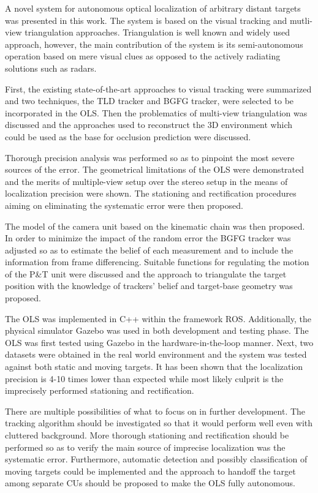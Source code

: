 A novel system for autonomous optical localization of arbitrary distant targets was presented in this work. The system is based on the visual tracking and mutli-view triangulation approaches. Triangulation is well known and widely used approach, however, the main contribution of the system is its semi-autonomous operation based on mere visual clues as opposed to the actively radiating solutions such as radars.

First, the existing state-of-the-art approaches to visual tracking were summarized and two techniques, the TLD tracker and BGFG tracker, were selected to be incorporated in the OLS. Then the problematics of multi-view triangulation was discussed and the approaches used to reconstruct the 3D environment which could be used as the base for occlusion prediction were discussed.

Thorough precision analysis was performed so as to pinpoint the most severe sources of the error. The geometrical limitations of the OLS were demonstrated and the merits of multiple-view setup over the stereo setup in the means of localization precision were shown. The stationing and rectification procedures aiming on eliminating the systematic error were then proposed. 

The model of the camera unit based on the kinematic chain was then proposed. In order to minimize the impact of the random error the BGFG tracker was adjusted so as to estimate the belief of each measurement and to include the information from frame differencing. Suitable functions for regulating the motion of the P\&T unit were discussed and the approach to triangulate the target position with the knowledge of trackers' belief and target-base geometry was proposed.

The OLS was implemented in C++ within the framework ROS. Additionally, the physical simulator Gazebo was used in both development and testing phase. The OLS was first tested using Gazebo in the hardware-in-the-loop manner. Next, two datasets were obtained in the real world environment and the system was tested against both static and moving targets. It has been shown that the localization precision is 4-10 times lower than expected while most likely culprit is the imprecisely performed stationing and rectification.

There are multiple possibilities of what to focus on in further development. The tracking algorithm should be investigated so that it would perform well even with cluttered background. More thorough stationing and rectification should be performed so as to verify the main source of imprecise localization was the systematic error. Furthermore, automatic detection and possibly classification of moving targets could be implemented and the approach to handoff the target among separate CUs should be proposed to make the OLS fully autonomous.